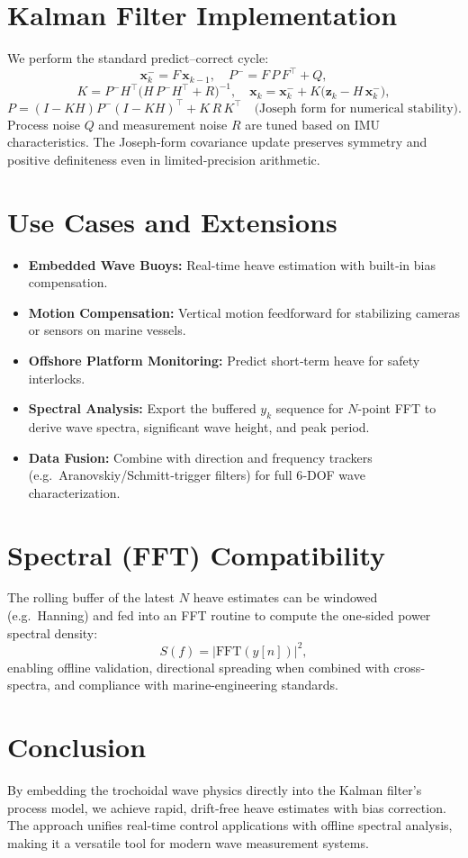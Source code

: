 \documentclass[12pt]{article}
\begin{document}
\section{Kalman Filter Implementation}
We perform the standard predict–correct cycle:
\[
\mathbf{x}_k^- = F\,\mathbf{x}_{k-1},\quad
P^- = F\,P\,F^\top + Q,
\]
\[
K = P^-H^\top\bigl(H\,P^-H^\top+R\bigr)^{-1},
\quad
\mathbf{x}_k = \mathbf{x}_k^- + K\bigl(\mathbf{z}_k - H\,\mathbf{x}_k^-\bigr),
\]
\[
P = (I-KH)P^-(I-KH)^\top + K\,R\,K^\top
\quad\text{(Joseph form for numerical stability).}
\]
Process noise \(Q\) and measurement noise \(R\) are tuned based on IMU characteristics.  The Joseph‐form covariance update preserves symmetry and positive definiteness even in limited‐precision arithmetic.

\section{Use Cases and Extensions}
\begin{itemize}
  \item \textbf{Embedded Wave Buoys:} Real‐time heave estimation with built‐in bias compensation.
  \item \textbf{Motion Compensation:} Vertical motion feedforward for stabilizing cameras or sensors on marine vessels.
  \item \textbf{Offshore Platform Monitoring:} Predict short‐term heave for safety interlocks.
  \item \textbf{Spectral Analysis:} Export the buffered \(y_k\) sequence for \(N\)-point FFT to derive wave spectra, significant wave height, and peak period.
  \item \textbf{Data Fusion:} Combine with direction and frequency trackers (e.g.\ Aranovskiy/Schmitt‐trigger filters) for full 6‐DOF wave characterization.
\end{itemize}

\section{Spectral (FFT) Compatibility}
The rolling buffer of the latest \(N\) heave estimates can be windowed (e.g.\ Hanning) and fed into an FFT routine to compute the one‐sided power spectral density:
\[
S(f) = \bigl|\mathrm{FFT}(y[n])\bigr|^2,
\]
enabling offline validation, directional spreading when combined with cross‐spectra, and compliance with marine‐engineering standards.

\section{Conclusion}
By embedding the trochoidal wave physics directly into the Kalman filter’s process model, we achieve rapid, drift‐free heave estimates with bias correction.  The approach unifies real‐time control applications with offline spectral analysis, making it a versatile tool for modern wave measurement systems.
\end{document}
